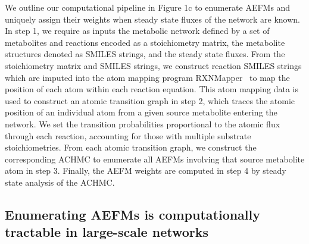 \documentclass[12pt]{article}
\begin{document}
We outline our computational pipeline in Figure 1c to enumerate AEFMs and
uniquely assign their weights when steady state fluxes of the network are
known. In step 1, we require as inputs the metabolic network
defined by a set of metabolites and reactions encoded as a stoichiometry
matrix, the metabolite structures denoted as SMILES strings, and the
steady state fluxes. From the stoichiometry matrix and SMILES strings, we
construct reaction SMILES strings which are imputed into the atom mapping
program RXNMapper~\citep{Schwaller2021extraction} to map the position of
each atom within each reaction equation. This atom mapping data is used to
construct an atomic transition graph in step 2, which traces the atomic
position of an individual atom from a given source metabolite entering the
network. We set the transition probabilities proportional to the atomic
flux through each reaction, accounting for those with multiple substrate
stoichiometries.
From each atomic transition graph, we construct the corresponding ACHMC to
enumerate all AEFMs involving that source metabolite atom in step 3.
Finally, the AEFM weights are computed in step 4 by steady state analysis
of the ACHMC. 

\subsection*{Enumerating AEFMs is computationally tractable in large-scale networks}
\end{document}
